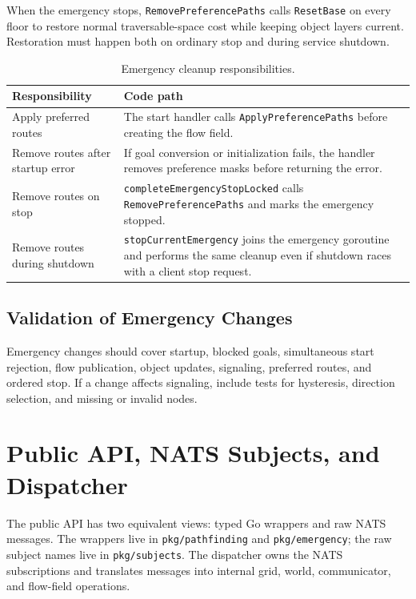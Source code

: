 \documentclass[12pt,a4paper]{report}
\begin{document}
When the emergency stops, \texttt{RemovePreferencePaths} calls
\texttt{ResetBase} on every floor to restore normal traversable-space cost while
keeping object layers current. Restoration must happen both on ordinary stop and
during service shutdown.

\begin{table}[H]
\centering
\begin{tabular}{|p{}|p{}|}
\hline
\textbf{Responsibility} & \textbf{Code path} \\
\hline
Apply preferred routes &
The start handler calls \texttt{ApplyPreferencePaths} before creating the flow
field. \\
\hline
Remove routes after startup error &
If goal conversion or initialization fails, the handler removes preference masks
before returning the error. \\
\hline
Remove routes on stop &
\texttt{completeEmergencyStopLocked} calls \texttt{RemovePreferencePaths} and
marks the emergency stopped. \\
\hline
Remove routes during shutdown &
\texttt{stopCurrentEmergency} joins the emergency goroutine and performs the same
cleanup even if shutdown races with a client stop request. \\
\hline
\end{tabular}
\caption{Emergency cleanup responsibilities.}
\end{table}

\subsection{Validation of Emergency Changes}

Emergency changes should cover startup, blocked goals, simultaneous start
rejection, flow publication, object updates, signaling, preferred routes, and
ordered stop. If a change affects signaling, include tests for hysteresis,
direction selection, and missing or invalid nodes.

\section{Public API, NATS Subjects, and Dispatcher}

The public API has two equivalent views: typed Go wrappers and raw NATS
messages. The wrappers live in \texttt{pkg/pathfinding} and
\texttt{pkg/emergency}; the raw subject names live in \texttt{pkg/subjects}. The
dispatcher owns the NATS subscriptions and translates messages into internal
grid, world, communicator, and flow-field operations.
\end{document}
